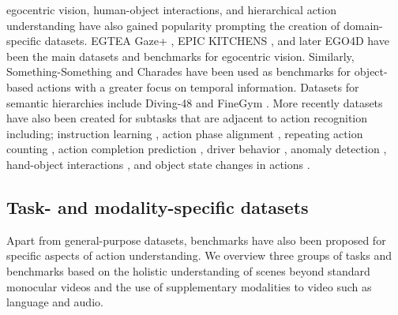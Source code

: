\documentclass[smallextended,twocolumn,natbib]{svjour3}
\begin{document}
egocentric vision, human-object interactions, and hierarchical action understanding have also gained popularity prompting the creation of domain-specific datasets. EGTEA Gaze+ \citep{li2015delving}, EPIC KITCHENS \citep{damen2022rescaling}, and later EGO4D \citep{grauman2022ego4d} have been the main datasets and benchmarks for egocentric vision. Similarly, Something-Something \citep{goyal2017something} and Charades \citep{sigurdsson2016hollywood} have been used as benchmarks for object-based actions with a greater focus on temporal information. Datasets for semantic hierarchies include Diving-48 \citep{li2018resound} and FineGym \citep{shao2020finegym}. More recently datasets have also been created for subtasks that are adjacent to action recognition including; instruction learning \citep{alayrac2016unsupervised,bansal2022my,ben2021ikea,ohkawa2023assemblyhands,sener2022assembly101,tang2019coin}, action phase alignment \citep{sermanet2017unsupervised}, repeating action counting \citep{dwibedi2020counting,dwibedi2024ovr,hu2022transrac,runia2018real,zhang2020context}, action completion prediction \citep{epstein2020oops}, driver behavior \citep{martin2019drive,ortega2020dmd}, anomaly detection \citep{acsintoae2022ubnormal,liu2018future,lu2013abnormal,sultani2018real,wu2020not}, hand-object interactions \citep{chao2021dexycb,garcia2018first,hampali2020honnotate,kwon2021h2o,moon2020interhand2,mueller2017real}, and object state changes in actions \citep{souvcek2022look}.



\subsection{Task- and modality-specific datasets}
\label{sec:datasets::specific}

Apart from general-purpose datasets, benchmarks have also been proposed for specific aspects of action understanding. We overview three groups of tasks and benchmarks based on the holistic understanding of scenes beyond standard monocular videos and the use of supplementary modalities to video such as language and audio. 
\end{document}
